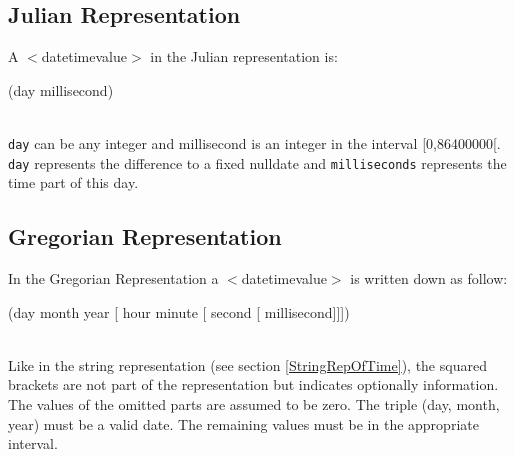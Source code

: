 \documentclass[english,a4paper]{article}
\begin{document}
\subsection{Julian Representation}
A $<$datetimevalue$>$ in the Julian representation is:\\
\begin{tt}
  \begin{small}
      (day millisecond)
  \end{small}
\end{tt}\\
{\tt day} can be any integer and millisecond is an integer in 
the interval [0,86400000[. {\tt day} represents the difference
to a fixed nulldate and {\tt milliseconds} represents the 
time part of this day.

\subsection{Gregorian Representation}
In the Gregorian Representation a $<$datetimevalue$>$ is written 
down as follow:\\
\begin{tt}
  \begin{small}
      (day month year [ hour minute [ second [ millisecond]]])
  \end{small}
\end{tt}\\
Like in the string representation (see section \ref{StringRepOfTime}),
the squared brackets are not part of the representation but indicates
optionally information. The values of the omitted parts are assumed to be zero.
The triple (day, month, year) must be a valid date. The remaining
values must be in the appropriate interval.
\end{document}
